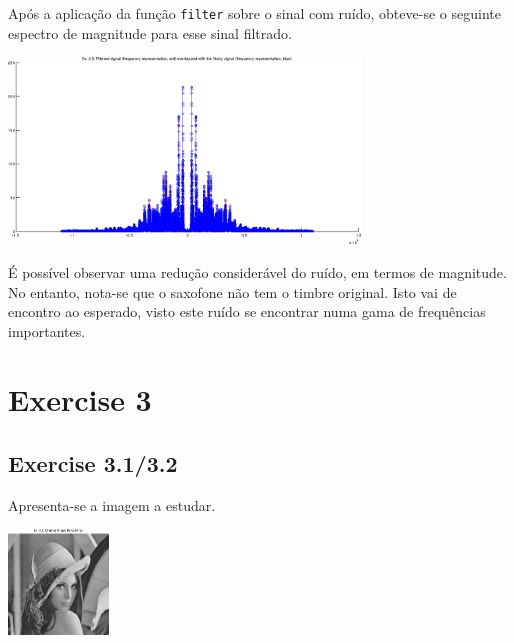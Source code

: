 \documentclass[a4paper]{article}
\begin{document}
\clearpage

\noindent Após a aplicação da função \texttt{filter} sobre o sinal com ruído, obteve-se o seguinte espectro de magnitude para esse sinal filtrado.
\begin{center}
	\includegraphics[width=0.70\textwidth]{images/ex_2_5_bandstop_spectrum.png}
	\label{fig:ex_2_5_bandstop_spectrum}
\end{center}

\noindent É possível observar uma redução considerável do ruído, em termos de magnitude. No entanto, nota-se que o saxofone não tem o timbre original. Isto vai de encontro ao esperado, visto este ruído se encontrar numa gama de frequências importantes.

\clearpage

\section{Exercise 3}
\subsection{Exercise 3.1/3.2}
\noindent Apresenta-se a imagem a estudar.
\begin{center}
	\includegraphics[width=0.20\textwidth]{images/ex_3_2.png}
	\label{fig:ex_3_2}
\end{center}
\end{document}
